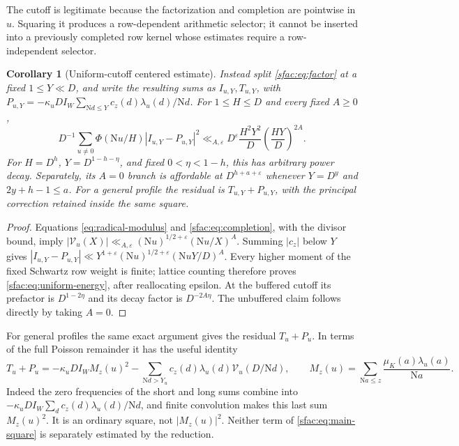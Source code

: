 \documentclass[11pt]{article}
\numberwithin{equation}{section}
\newtheorem{corollary}[theorem]{Corollary}
\theoremstyle{definition}
\theoremstyle{remark}
\newcommand{\N}{\mathrm N}
\begin{document}
The cutoff is legitimate because the factorization and completion are
pointwise in $u$.  Squaring it produces a row-dependent arithmetic
selector; it cannot be inserted into a previously completed row kernel
whose estimates require a row-independent selector.

\begin{corollary}[Uniform-cutoff centered estimate]
\label{sfac:cor:uniform}
Instead split \eqref{sfac:eq:factor} at a fixed $1\le Y\ll D$, and
write the resulting sums as $I_{u,Y},T_{u,Y}$, with
$P_{u,Y}=-\kappa_uDI_W\sum_{\N d\le Y}c_z(d)\lambda_u(d)/\N d$.
For $1\le H\le D$ and every fixed $A\ge0$,
\begin{equation}
 D^{-1}\sum_{u\ne0}\Phi(\N u/H)|I_{u,Y}-P_{u,Y}|^2
 \ll_{A,\varepsilon}D^\varepsilon
       \frac{H^2Y^2}{D}\left(\frac{HY}{D}\right)^{2A}.
 \label{sfac:eq:uniform-energy}
\end{equation}
For $H=D^h$, $Y=D^{1-h-\eta}$, and fixed $0<\eta<1-h$, this
has arbitrary power decay.  Separately, its $A=0$ branch is affordable
at $D^{h+a+\varepsilon}$ whenever $Y=D^y$ and $2y+h-1\le a$.
For a general profile the residual is $T_{u,Y}+P_{u,Y}$, with the
principal correction retained inside the same square.
\end{corollary}

\begin{proof}
Equations \eqref{eq:radical-modulus} and
\eqref{sfac:eq:completion}, with the divisor bound, imply
$|\mathcal V_u(X)|\ll_{A,\varepsilon}(\N u)^{1/2+\varepsilon}(\N u/X)^A$.
Summing $|c_z|$ below $Y$ gives
$|I_{u,Y}-P_{u,Y}|\ll Y^{1+\varepsilon}
(\N u)^{1/2+\varepsilon}(\N u Y/D)^A$.
Every higher moment of the fixed Schwartz row weight is finite;
lattice counting therefore proves \eqref{sfac:eq:uniform-energy},
after reallocating epsilon.  At the buffered cutoff its prefactor is
$D^{1-2\eta}$ and its decay factor is $D^{-2A\eta}$.  The unbuffered
claim follows directly by taking $A=0$.
\end{proof}

For general profiles the same exact argument gives the residual
$T_u+P_u$.  In terms of the full Poisson remainder it has the useful
identity
\begin{equation}
 T_u+P_u=-\kappa_uDI_W M_z(u)^2
       -\sum_{\N d>Y_u}c_z(d)\lambda_u(d)\mathcal V_u(D/\N d),
 \qquad
 M_z(u)=\sum_{\N a\le z}\frac{\mu_K(a)\lambda_u(a)}{\N a}.
 \label{sfac:eq:main-square}
\end{equation}
Indeed the zero frequencies of the short and long sums combine into
$-\kappa_uDI_W\sum_d c_z(d)\lambda_u(d)/\N d$, and finite convolution
makes this last sum $M_z(u)^2$.  It is an ordinary square, not
$|M_z(u)|^2$.  Neither term of \eqref{sfac:eq:main-square} is separately
estimated by the reduction.
\end{document}
